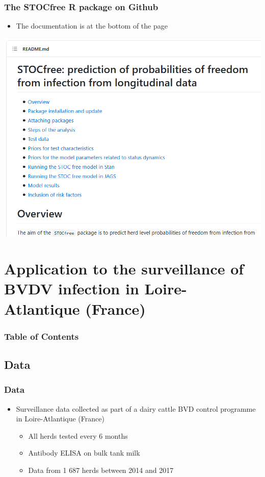 \documentclass{beamer}
\begin{document}
\begin{frame}
\frametitle{The STOCfree R package on Github}
\begin{itemize}
 \item{The documentation is at the bottom of the page}
\end{itemize}
\includegraphics[width=.9\textwidth]{imgs/STOCfree_Github_1.png}
\end{frame}


\section[Application]{Application to the surveillance of BVDV infection in Loire-Atlantique (France)}

\begin{frame}
\frametitle{Table of Contents}
  \tableofcontents[currentsection]
\end{frame} 

\subsection{Data}

\begin{frame}
\frametitle{Data}
\begin{itemize}
 \item{Surveillance data collected as part of a dairy cattle BVD control programme in Loire-Atlantique (France)}
 \begin{itemize}
  \item{All herds tested every 6 months}
  \item{Antibody ELISA on bulk tank milk}
  \item{Data from 1 687 herds between 2014 and 2017}
 \end{itemize}
\end{itemize}
\end{frame}
\end{document}
